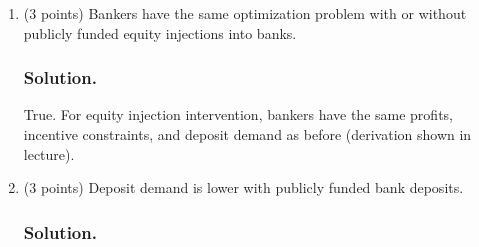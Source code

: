 \documentclass[12pt]{article}
\begin{document}
\begin{enumerate}
\begin{enumerate}

        
    
     \item (3 points) Bankers have the same optimization problem with or without publicly funded
        equity injections into banks.
        \subsubsection*{Solution.}

        True. For equity injection intervention, bankers have the same profits, incentive constraints, and deposit demand as before (derivation shown in lecture). 
    
     
     \item (3 points) Deposit demand is lower with publicly funded bank deposits.
     \subsubsection*{Solution.}


\end{enumerate}
\end{enumerate}
\end{document}
